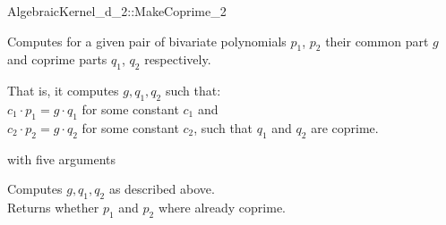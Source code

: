 \begin{ccRefFunctionObjectConcept}{AlgebraicKernel_d_2::MakeCoprime_2}

\ccDefinition
Computes for a given pair of bivariate polynomials $p_1$, $p_2$ their
common part $g$ and coprime parts $q_1$, $q_2$ respectively.

That is, it computes $g, q_1, q_2$ such that:\\
\hspace{1cm} $c_1 \cdot p_1 =  g \cdot q_1$ for some constant $c_1$ and\\
\hspace{1cm} $c_2 \cdot p_2 =  g \cdot q_2$ for some constant $c_2$, 
such that $q_1$ and $q_2$ are coprime. 

\ccRefines 
{} with five arguments 

\ccTypes \ccThree{}{+++++++++++++}{++++++++}

\ccOperations \ccThree{+++++++++}{+++++++++}{}


{ Computes $g, q_1, q_2$ as described above.\\
Returns whether $p_1$ and $p_2$ where already coprime. 
}

\ccSeeAlso
{}\\

\end{ccRefFunctionObjectConcept}
